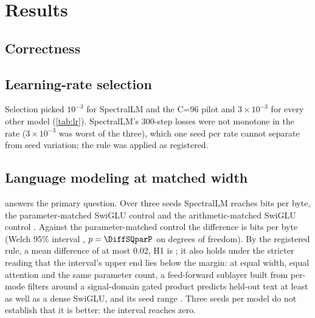
\section{Results}
\label{sec:results}

\StatusResults

\subsection{Correctness}
\label{sec:res-correctness}



\subsection{Learning-rate selection}
\label{sec:res-lr}



Selection picked $10^{-3}$ for SpectralLM and the C=96 pilot and
$3\times10^{-3}$ for every other model (\cref{tab:lr}). SpectralLM's 300-step
losses were not monotone in the rate ($3\times10^{-3}$ was worst of the
three), which one seed per rate cannot separate from seed variation; the rule
was applied as registered.

\subsection{Language modeling at matched width}
\label{sec:res-primary}



 answers the primary question. Over three seeds SpectralLM
reaches \BpbS{} bits per byte, the parameter-matched SwiGLU control \BpbQpar{}
and the arithmetic-matched SwiGLU control \BpbQstd{}. Against the
parameter-matched control the difference is \DiffSQpar{} bits per byte (Welch
95\% interval \DiffSQparCI{}, $p=\DiffSQparP$ on \DiffSQparDF{} degrees of
freedom). By the registered rule, a mean difference of at most 0.02, H1 is
\HOneVerdict{}; it also holds under the stricter reading that the interval's
upper end lies below the margin: at equal width, equal attention and the same
parameter count, a feed-forward sublayer built from per-mode filters around a
signal-domain gated product predicts held-out text at least as well as a dense
SwiGLU, and its seed range \RangeRelation{}. Three seeds per model do not
establish that it is better: the interval reaches zero.

